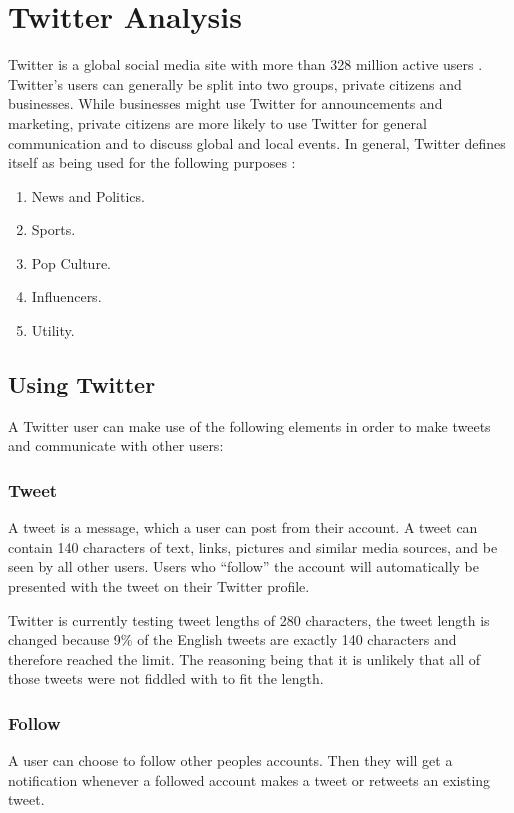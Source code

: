 \section{Twitter Analysis}\label{sec:twitter-analysis}
Twitter is a global social media site with more than 328 million active users
\citep{aboutTwitter}. Twitter's users can generally be split into two groups,
private citizens and businesses. While businesses might use Twitter for
announcements and marketing, private citizens are more likely to use Twitter for
general communication and to discuss global and local events. In general,
Twitter defines itself as being used for the following purposes
\citep{StartingTwitter}:

\begin{enumerate}    
  \item News and Politics.
  \item Sports.
  \item Pop Culture. 
  \item Influencers.
  \item Utility.
\end{enumerate} %

\subsection{Using Twitter}
A Twitter user can make use of the following elements \citep{StartingTwitter}
in order to make tweets and communicate with other users:

\subsubsection{Tweet}
A tweet is a message, which a user can post from their account. A tweet can
contain 140 characters\citep{StartingTwitter2} of text, links, pictures and
similar media sources, and be seen by all other users. Users who ``follow'' the
account will automatically be presented with the tweet on their Twitter profile.

Twitter is currently testing tweet lengths of 280 characters, the tweet length
is changed because 9\% of the English tweets are exactly 140 characters and
therefore reached the limit. The reasoning being that it is unlikely that all of
those tweets were not fiddled with to fit the length\cite{TweetL}.

\subsubsection{Follow}
A user can choose to follow other peoples accounts. Then they will get a
notification whenever a followed account makes a tweet or retweets an existing
tweet.

